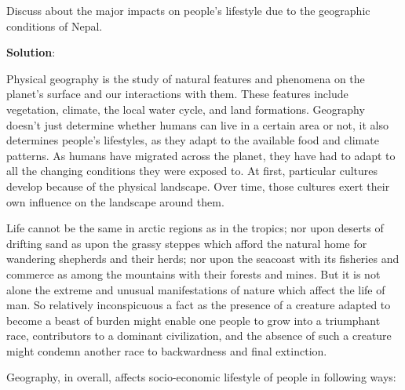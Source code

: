 \documentclass[
]{book}
\newcommand{\question}{\item}
\newenvironment{solution}{ {\bfseries Solution}:}{}
\begin{document}
\begin{questions}

\question Discuss about the major impacts on people's lifestyle due to the geographic conditions of Nepal.

\begin{solution}

Physical geography is the study of natural features and phenomena on the planet's surface and our interactions with them. These features include vegetation, climate, the local water cycle, and land formations. Geography doesn't just determine whether humans can live in a certain area or not, it also determines people's lifestyles, as they adapt to the available food and climate patterns. As humans have migrated across the planet, they have had to adapt to all the changing conditions they were exposed to. At first, particular cultures develop because of the physical landscape. Over time, those cultures exert their own influence on the landscape around them.

Life cannot be the same in arctic regions as in the tropics; nor upon deserts of drifting sand as upon the grassy steppes which afford the natural home for wandering shepherds and their herds; nor upon the seacoast with its fisheries and commerce as among the mountains with their forests and mines. But it is not alone the extreme and unusual manifestations of nature which affect the life of man. So relatively inconspicuous a fact as the presence of a creature adapted to become a beast of burden might enable one people to grow into a triumphant race, contributors to a dominant civilization, and the absence of such a creature might condemn another race to backwardness and final extinction.

Geography, in overall, affects socio-economic lifestyle of people in following ways:


\end{solution}
\end{questions}
\end{document}
